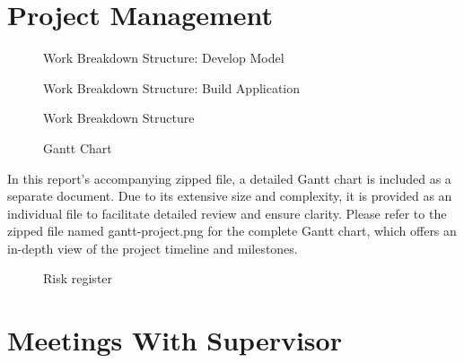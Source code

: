 \documentclass[preprint,11pt,review,authoryear]{elsarticle}
\begin{document}
\section{Project Management} \label{J}
\renewcommand{\thepage}{J\arabic{page}} %
\begin{figure}[h]
    
    \caption{Work Breakdown Structure: Develop Model}
    \label{fig:WBS: Develop Model}
\end{figure}
\newpage
\begin{landscape}
    \begin{figure}[h]
        
        \caption{Work Breakdown Structure: Build Application}
        \label{fig:WBS: Build Application}
    \end{figure}
\end{landscape}
\newpage
\begin{figure}[h]
    
    \caption{Work Breakdown Structure}
    \label{fig:WBS: Project Charter}
\end{figure}
\newpage
\begin{landscape}
    \begin{figure}[h]
        \centering
        \caption{Gantt Chart}
        \label{fig:GanttChart}
    \end{figure}
    In this report's accompanying zipped file, a detailed Gantt chart is included as a separate document. Due to its extensive size and complexity, it is provided as an individual file to facilitate detailed review and ensure clarity. Please refer to the zipped file named gantt-project.png for the complete Gantt chart, which offers an in-depth view of the project timeline and milestones.
\end{landscape}
\begin{figure}[h]
    
    \caption{Risk register}
    \label{fig:Risk Register}
\end{figure}
\newpage
\section{Meetings With Supervisor} \label{K}
\renewcommand{\thepage}{K\arabic{page}}
\newpage

\end{document}
